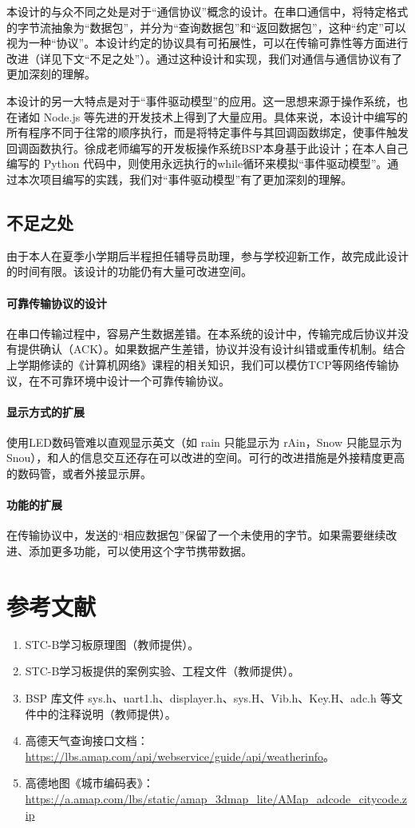 \documentclass{article}
\begin{document}
本设计的与众不同之处是对于“通信协议”概念的设计。在串口通信中，将特定格式的字节流抽象为“数据包”，并分为“查询数据包”和“返回数据包”，这种“约定”可以视为一种“协议”。本设计约定的协议具有可拓展性，可以在传输可靠性等方面进行改进（详见下文“不足之处”）。通过这种设计和实现，我们对通信与通信协议有了更加深刻的理解。

本设计的另一大特点是对于“事件驱动模型”的应用。这一思想来源于操作系统，也在诸如 Node.js 等先进的开发技术上得到了大量应用。具体来说，本设计中编写的所有程序不同于往常的顺序执行，而是将特定事件与其回调函数绑定，使事件触发回调函数执行。徐成老师编写的开发板操作系统BSP本身基于此设计；在本人自己编写的 Python 代码中，则使用永远执行的while循环来模拟“事件驱动模型”。通过本次项目编写的实践，我们对“事件驱动模型”有了更加深刻的理解。

\subsection{不足之处}

由于本人在夏季小学期后半程担任辅导员助理，参与学校迎新工作，故完成此设计的时间有限。该设计的功能仍有大量可改进空间。

\paragraph{可靠传输协议的设计} 在串口传输过程中，容易产生数据差错。在本系统的设计中，传输完成后协议并没有提供确认（ACK）。如果数据产生差错，协议并没有设计纠错或重传机制。结合上学期修读的《计算机网络》课程的相关知识，我们可以模仿TCP等网络传输协议，在不可靠环境中设计一个可靠传输协议。

\paragraph{显示方式的扩展} 使用LED数码管难以直观显示英文（如 rain 只能显示为 rAin，Snow 只能显示为 Snou），和人的信息交互还存在可以改进的空间。可行的改进措施是外接精度更高的数码管，或者外接显示屏。

\paragraph{功能的扩展} 在传输协议中，发送的“相应数据包”保留了一个未使用的字节。如果需要继续改进、添加更多功能，可以使用这个字节携带数据。

\section{参考文献}

\begin{enumerate}
  \item STC-B学习板原理图（教师提供）。
  \item STC-B学习板提供的案例实验、工程文件（教师提供）。
  \item BSP 库文件 sys.h、uart1.h、displayer.h、sys.H、Vib.h、Key.H、adc.h 等文件中的注释说明（教师提供）。
  \item 高德天气查询接口文档：\url{https://lbs.amap.com/api/webservice/guide/api/weatherinfo}。
  \item 高德地图《城市编码表》：\url{https://a.amap.com/lbs/static/amap_3dmap_lite/AMap_adcode_citycode.zip}
\end{enumerate}
\end{document}
